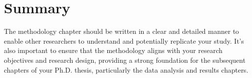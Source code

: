 \section{Summary}
The methodology chapter should be written in a clear and detailed manner to enable other researchers to understand and potentially replicate your study. It's also important to ensure that the methodology aligns with your research objectives and research design, providing a strong foundation for the subsequent chapters of your Ph.D. thesis, particularly the data analysis and results chapters.
  
 











